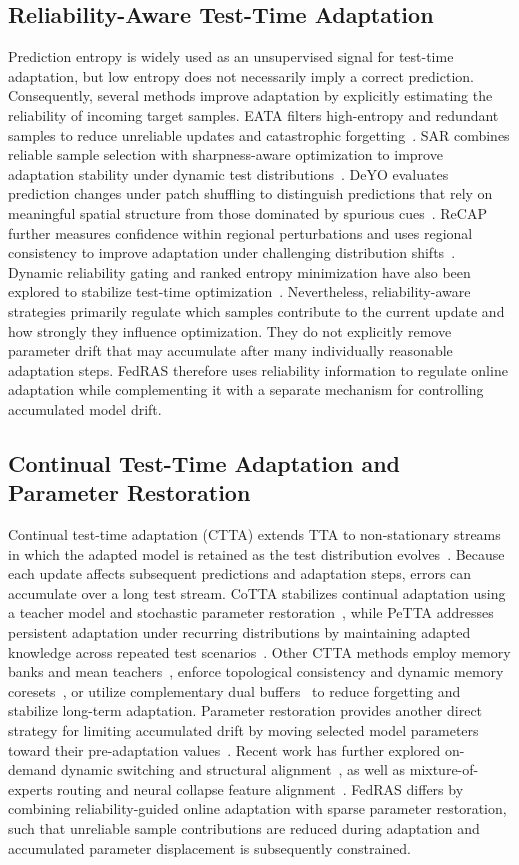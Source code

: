 \documentclass[journal]{IEEEtran}
\begin{document}
\subsection{Reliability-Aware Test-Time Adaptation}
Prediction entropy is widely used as an unsupervised signal for test-time adaptation, but low entropy does not necessarily imply a correct prediction. Consequently, several methods improve adaptation by explicitly estimating the reliability of incoming target samples. EATA filters high-entropy and redundant samples to reduce unreliable updates and catastrophic forgetting~\cite{7}. SAR combines reliable sample selection with sharpness-aware optimization to improve adaptation stability under dynamic test distributions~\cite{8}. DeYO evaluates prediction changes under patch shuffling to distinguish predictions that rely on meaningful spatial structure from those dominated by spurious cues~\cite{9}. ReCAP further measures confidence within regional perturbations and uses regional consistency to improve adaptation under challenging distribution shifts~\cite{10}. Dynamic reliability gating and ranked entropy minimization have also been explored to stabilize test-time optimization~\cite{24, 25}. Nevertheless, reliability-aware strategies primarily regulate which samples contribute to the current update and how strongly they influence optimization. They do not explicitly remove parameter drift that may accumulate after many individually reasonable adaptation steps. FedRAS therefore uses reliability information to regulate online adaptation while complementing it with a separate mechanism for controlling accumulated model drift.

\subsection{Continual Test-Time Adaptation and Parameter Restoration}
Continual test-time adaptation (CTTA) extends TTA to non-stationary streams in which the adapted model is retained as the test distribution evolves~\cite{5, 6}. Because each update affects subsequent predictions and adaptation steps, errors can accumulate over a long test stream. CoTTA stabilizes continual adaptation using a teacher model and stochastic parameter restoration~\cite{5}, while PeTTA addresses persistent adaptation under recurring distributions by maintaining adapted knowledge across repeated test scenarios~\cite{6}. Other CTTA methods employ memory banks and mean teachers~\cite{11, 12}, enforce topological consistency and dynamic memory coresets~\cite{26, 27}, or utilize complementary dual buffers~\cite{28} to reduce forgetting and stabilize long-term adaptation. Parameter restoration provides another direct strategy for limiting accumulated drift by moving selected model parameters toward their pre-adaptation values~\cite{13}. Recent work has further explored on-demand dynamic switching and structural alignment~\cite{29, 30}, as well as mixture-of-experts routing and neural collapse feature alignment~\cite{31, 32}. FedRAS differs by combining reliability-guided online adaptation with sparse parameter restoration, such that unreliable sample contributions are reduced during adaptation and accumulated parameter displacement is subsequently constrained.
\end{document}
